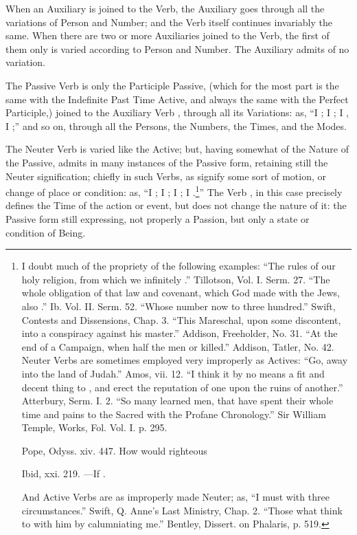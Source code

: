 When an Auxiliary is joined to the Verb, the Auxiliary goes through all
the variations of Person and Number; and the Verb itself continues
invariably the same. When there are two or more Auxiliaries joined to
the Verb, the first of them only is varied according to Person and
Number. The Auxiliary  admits of no variation.

The Passive Verb is only the Participle Passive, (which for the most
part is the same with the Indefinite Past Time Active, and always the
same with the Perfect Participle,) joined to the Auxiliary Verb , through all its Variations: as, ``I ; I ; I , I ;'' and so on,
through all the Persons, the Numbers, the Times, and the Modes.

The Neuter Verb is varied like the Active; but, having somewhat of the
Nature of the Passive, admits in many instances of the Passive form,
retaining still the Neuter signification; chiefly in such Verbs, as
signify some sort of motion, or change of place or condition: as, ``I
; I ; I ; I .\footnote{I doubt much of the propriety of the following
  examples: ``The rules of our holy religion, from which we 
  infinitely .'' Tillotson, Vol. I. Serm. 27. ``The whole
  obligation of that law and covenant, which God made with the Jews,
   also .'' Ib. Vol. II. Serm. 52. ``Whose number
   now  to three hundred.'' Swift, Contests and
  Dissensions, Chap. 3. ``This Mareschal, upon some discontent,  into a conspiracy against his master.'' Addison,
  Freeholder, No. 31. ``At the end of a Campaign, when half the men
   or killed.'' Addison, Tatler, No. 42. Neuter Verbs
  are sometimes employed very improperly as Actives: ``Go,  away into the land of Judah.'' Amos, vii. 12. ``I think it by
  no means a fit and decent thing to , and erect the
  reputation of one upon the ruins of another.'' Atterbury, Serm. I. 2.
  ``So many learned men, that have spent their whole time and pains to
   the Sacred with the Profane Chronology.'' Sir William
  Temple, Works, Fol. Vol. I. p. 295.

  \begin{aquote}{Pope, Odyss. xiv. 447.}
    How would  righteous 
  \end{aquote}

  \begin{aquote}{Ibid, xxi. 219.}
    ---If .
  \end{aquote}

  And Active Verbs are as improperly made Neuter; as, ``I must
   with three circumstances.'' Swift, Q. Anne's Last
  Ministry, Chap. 2. ``Those what think to  with him by
  calumniating me.'' Bentley, Dissert. on Phalaris, p. 519.}'' The Verb
, in this case precisely defines the Time of the action or
event, but does not change the nature of it: the Passive form still
expressing, not properly a Passion, but only a state or condition of
Being.
